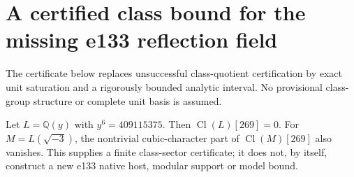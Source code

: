 \section{A certified class bound for the missing e133 reflection field}
\label{sec:cubic-e133-class-certificate}
The certificate below replaces unsuccessful class-quotient certification
by exact unit saturation and a rigorously bounded analytic interval.
No provisional class-group structure or complete unit basis is assumed.

\begin{theorem}
\label{AC-G131-e133-class}
Let $L=\mathbb Q(y)$ with $y^6=409115375$.
Then $\operatorname{Cl}(L)[269]=0$.
For $M=L(\sqrt{-3})$, the nontrivial cubic-character part of
$\operatorname{Cl}(M)[269]$ also vanishes.
This supplies a finite class-sector certificate; it does not, by itself,
construct a new e133 native host, modular support or model bound.
\end{theorem}
